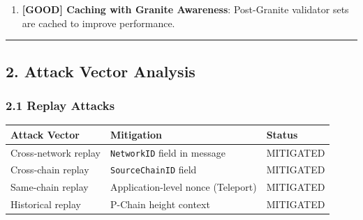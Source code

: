 \documentclass[
]{article}
\newenvironment{Shaded}{}{}
\newcommand{\BuiltInTok}[1]{\textcolor[rgb]{0.00,0.50,0.00}{#1}}
\newcommand{\CommentTok}[1]{\textcolor[rgb]{0.38,0.63,0.69}{\textit{#1}}}
\newcommand{\ControlFlowTok}[1]{\textcolor[rgb]{0.00,0.44,0.13}{\textbf{#1}}}
\newcommand{\NormalTok}[1]{#1}
\newcommand{\OperatorTok}[1]{\textcolor[rgb]{0.40,0.40,0.40}{#1}}
\newcounter{none} %
\begin{document}
\begin{enumerate}
\begin{Shaded}
\begin{Highlighting}[]
\CommentTok{// validator.go:116{-}123}
\ControlFlowTok{if}\NormalTok{ existingVdr}\OperatorTok{,}\NormalTok{ exists }\OperatorTok{:=}\NormalTok{ pkToValidator}\OperatorTok{[}\NormalTok{pkKey}\OperatorTok{];}\NormalTok{ exists }\OperatorTok{\{}
\NormalTok{    existingVdr}\OperatorTok{.}\NormalTok{Weight}\OperatorTok{,}\NormalTok{ err }\OperatorTok{=}\NormalTok{ math}\OperatorTok{.}\NormalTok{Add}\OperatorTok{(}\NormalTok{existingVdr}\OperatorTok{.}\NormalTok{Weight}\OperatorTok{,}\NormalTok{ vdr}\OperatorTok{.}\NormalTok{Weight}\OperatorTok{)}
\NormalTok{    existingVdr}\OperatorTok{.}\NormalTok{NodeIDs }\OperatorTok{=} \BuiltInTok{append}\OperatorTok{(}\NormalTok{existingVdr}\OperatorTok{.}\NormalTok{NodeIDs}\OperatorTok{,}\NormalTok{ vdr}\OperatorTok{.}\NormalTok{NodeID}\OperatorTok{)}
\OperatorTok{\}}
\end{Highlighting}
\end{Shaded}
\item
  \textbf{{[}GOOD{]} Caching with Granite Awareness}: Post-Granite
  validator sets are cached to improve performance.
\end{enumerate}

\begin{center}\rule{0.5\linewidth}{0.5pt}\end{center}

\subsection{2. Attack Vector Analysis}\label{2-attack-vector-analysis}

\subsubsection{2.1 Replay Attacks}\label{21-replay-attacks}

{\def\LTcaptype{none} %
\begin{longtable}[]{@{}lll@{}}
\toprule\noalign{}
Attack Vector & Mitigation & Status \\
\midrule\noalign{}
\endhead
\bottomrule\noalign{}
\endlastfoot
Cross-network replay & \texttt{NetworkID} field in message &
MITIGATED \\
Cross-chain replay & \texttt{SourceChainID} field & MITIGATED \\
Same-chain replay & Application-level nonce (Teleport) & MITIGATED \\
Historical replay & P-Chain height context & MITIGATED \\
\end{longtable}
}
\end{document}

